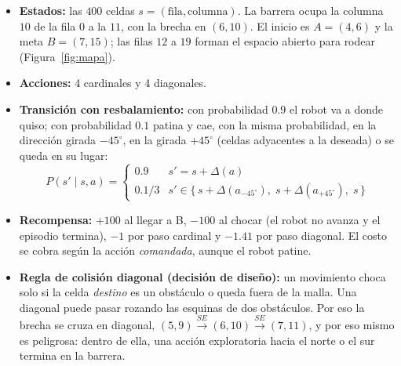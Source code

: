 \documentclass[11pt]{article}
\begin{document}
\begin{itemize}
    \item \textbf{Estados:} las $400$ celdas $s = (\text{fila}, \text{columna})$.
    La barrera ocupa la columna $10$ de la fila $0$ a la $11$, con la brecha en
    $(6, 10)$. El inicio es $A = (4, 6)$ y la meta $B = (7, 15)$; las filas $12$ a
    $19$ forman el espacio abierto para rodear (Figura~\ref{fig:mapa}).
    \item \textbf{Acciones:} 4 cardinales y 4 diagonales.
    \item \textbf{Transición con resbalamiento:} con probabilidad $0.9$ el robot va
    a donde quiso; con probabilidad $0.1$ patina y cae, con la misma probabilidad,
    en la dirección girada $-45^\circ$, en la girada $+45^\circ$ (celdas
    adyacentes a la deseada) o se queda en su lugar:
    \begin{equation}
    P(s' \mid s, a) =
    \begin{cases}
    0.9 & s' = s + \Delta(a)\\
    0.1/3 & s' \in \{\, s + \Delta(a_{-45^\circ}),\; s + \Delta(a_{+45^\circ}),\; s \,\}
    \end{cases}
    \label{eq:slip}
    \end{equation}
    \item \textbf{Recompensa:} $+100$ al llegar a B, $-100$ al chocar (el robot no
    avanza y el episodio termina), $-1$ por paso cardinal y $-1.41$ por paso
    diagonal. El costo se cobra según la acción \emph{comandada}, aunque el robot
    patine.
    \item \textbf{Regla de colisión diagonal (decisión de diseño):} un movimiento
    choca solo si la celda \emph{destino} es un obstáculo o queda fuera de la
    malla. Una diagonal puede pasar rozando las esquinas de dos obstáculos. Por eso
    la brecha se cruza en diagonal, $(5,9) \xrightarrow{SE} (6,10) \xrightarrow{SE} (7,11)$,
    y por eso mismo es peligrosa: dentro de ella, una acción exploratoria hacia
    el norte o el sur termina en la barrera.
\end{itemize}
\end{document}
